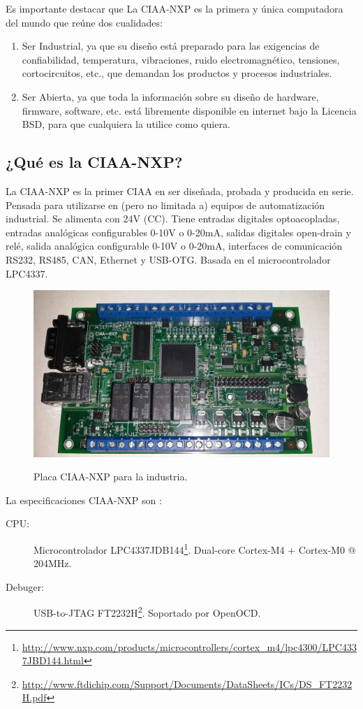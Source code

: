 \begin{description}
Es importante destacar que La CIAA-NXP es la primera y única computadora del mundo que reúne dos cualidades:

\begin{enumerate}
  \item Ser Industrial, ya que su diseño está preparado para las exigencias de confiabilidad, temperatura, vibraciones, ruido electromagnético, tensiones, cortocircuitos, etc., que demandan los productos y procesos industriales.
  \item Ser Abierta, ya que toda la información sobre su diseño de hardware, firmware, software, etc. está libremente disponible en internet bajo la Licencia BSD, para que cualquiera la utilice como quiera.
\end{enumerate}

\subsection{¿Qué es la CIAA-NXP?}

La CIAA-NXP es la primer CIAA en ser diseñada, probada y producida en serie. Pensada para utilizarse en (pero no limitada a) equipos de automatización industrial. Se alimenta con 24V (CC). Tiene entradas digitales optoacopladas, entradas analógicas configurables 0-10V o 0-20mA, salidas digitales open-drain y relé, salida analógica configurable 0-10V o 0-20mA, interfaces de comunicación RS232, RS485, CAN, Ethernet y USB-OTG. Basada en el microcontrolador LPC4337. 

\begin{figure}
  \centering
  \includegraphics[scale=.2]{./Figures/ciaa.png}
  \label{fig:ciaa}
  \caption{Placa CIAA-NXP para la industria.}
\end{figure}

La especificaciones CIAA-NXP son :
\begin{description}
  \item[CPU:] Microcontrolador LPC4337JDB144\footnote{\url{http://www.nxp.com/products/microcontrollers/cortex_m4/lpc4300/LPC4337JBD144.html}}. Dual-core Cortex-M4 + Cortex-M0 @ 204MHz.
  \item[Debuger:] USB-to-JTAG FT2232H\footnote{\url{http://www.ftdichip.com/Support/Documents/DataSheets/ICs/DS_FT2232H.pdf}}. Soportado por OpenOCD.


\end{description}
\end{description}
